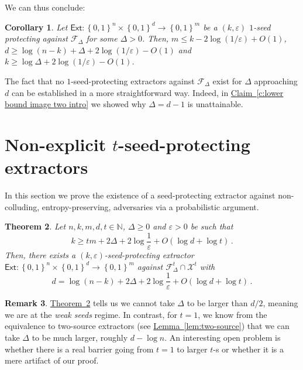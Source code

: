 \documentclass[11pt]{article}
\numberwithin{equation}{section}
\newtheorem{theorem}{Theorem}[section]
\newtheorem{corollary}[theorem]{Corollary}
\theoremstyle{definition}
\newtheorem{remark}[theorem]{Remark}
\theoremstyle{plain}
\newcommand{\expref}[2]{\hyperref[#2]{#1~\ref{#2}}}
\newcommand{\ext}{\mathsf{Ext}}
\newcommand{\eps}{\varepsilon}
\newcommand{\nc}{\mathcal{X}}
\newcommand{\set}[1]{\left\{{#1}\right\}}
\newcommand{\B}{\set{0,1}}
\newcommand{\advfampart}{\mathcal{F}}
\begin{document}
We can thus conclude:
\begin{corollary}
Let $\ext \colon \B^{n} \times \B^{d} \rightarrow \B^{m}$ be a $(k,\eps)$ $1$-seed protecting against $\advfampart_{\Delta}$ for some $\Delta > 0$.
Then, 
$m \le k - 2\log(1/\eps)+O(1)$, $d \ge  \log(n-k)+\Delta+2\log(1/\eps)-O(1)$
and $k \ge \log\Delta+2\log(1/\eps)-O(1)$.
\end{corollary}

The fact that no $1$-seed-protecting extractors against $\advfampart_\Delta$
exist for $\Delta$ approaching $d$ can be established in a more straightforward
way. 
Indeed, in \expref{Claim}{c:lower bound image two intro} we showed why
$\Delta = d-1$ is unattainable.


%
\section{Non-explicit 
\texorpdfstring{$t$-seed-protecting}{t-seed-protecting} extractors}\label{sec:nexp}

In this section we prove the existence of a seed-protecting extractor against non-colluding, entropy-preserving, adversaries via a probabilistic argument.

\begin{theorem}\label{thm:non-explicit}
Let $n,k,m,d,t \in \mathbb{N}$, $\Delta \ge 0$ and $\eps > 0$ be such that
\[
k \ge tm+2\Delta+2\log\frac{1}{\eps}+O(\log d + \log t)\,.
\]
Then, there exists a $(k,\eps)$-seed-protecting extractor $\ext \colon \B^{n} \times \B^{d} \rightarrow \B^{m}$ against
$\mathcal{F}_{\Delta}^{t} \cap \nc^t$ with
\[
d  = \log(n-k) + 2\Delta +2\log\frac{1}{\eps}+O(\log d + \log t)\,.
\]
\end{theorem}

%
\begin{remark}  %
\expref{Theorem}{thm:non-explicit} tells us we cannot take $\Delta$ to be larger than %
%
$d/2$, 
%
meaning
we are at the \emph{weak seeds} regime. In contrast, for $t = 1$, we know from the
equivalence to two-source extractors (see \expref{Lemma}{lem:two-source}) that we can take
$\Delta$ to be much larger, roughly $d-\log n$. An interesting open problem is 
whether there is a real barrier going from $t = 1$ to larger $t$-s or whether it is a mere
artifact of our proof.
\end{remark}   %
\end{document}
